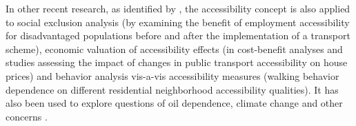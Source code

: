 In other recent research, as identified by \citet{GeursEtAl2012AccessibilityTransportIntroduction},
the accessibility concept is also applied to social exclusion analysis (\eg by examining the benefit of
employment accessibility for disadvantaged populations before and after the implementation of a 
transport scheme), economic valuation of accessibility effects (\eg in cost-benefit analyses and studies 
assessing the impact of changes in public transport accessibility on house prices) and behavior analysis 
vis-a-vis accessibility measures (\eg walking behavior dependence on different residential neighborhood accessibility qualities).
It has also been used to explore questions of oil dependence, climate change and 
other concerns \citep{CurtisEtAl2013AccessibilityPolicyInnovation}.



